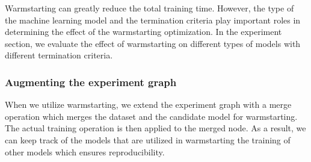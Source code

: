 Warmstarting can greatly reduce the total training time.
However, the type of the machine learning model and the termination criteria play important roles in determining the effect of the warmstarting optimization.
In the experiment section, we evaluate the effect of warmstarting on different types of models with different termination criteria.

\subsubsection{Augmenting the experiment graph}
When we utilize warmstarting, we extend the experiment graph with a merge operation which merges the dataset and the candidate model for warmstarting.
The actual training operation is then applied to the merged node.
As a result, we can keep track of the models that are utilized in warmstarting the training of other models which ensures reproducibility.

%


